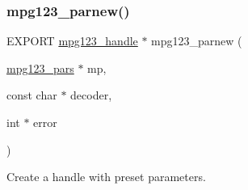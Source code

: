 \subsubsection{\texorpdfstring{mpg123\+\_\+parnew()}{mpg123\_parnew()}}
{\footnotesize\ttfamily E\+X\+P\+O\+RT \hyperlink{group__mpg123__init_ga6728e2839a395f3a07d4514da659faca}{mpg123\+\_\+handle} $\ast$ mpg123\+\_\+parnew (\begin{DoxyParamCaption}\item[{\hyperlink{group__mpg123__advpar_ga3983578625af3bb6dc7e3b74d0cab4aa}{mpg123\+\_\+pars} $\ast$}]{mp,  }\item[{const char $\ast$}]{decoder,  }\item[{int $\ast$}]{error }\end{DoxyParamCaption})}

Create a handle with preset parameters. 